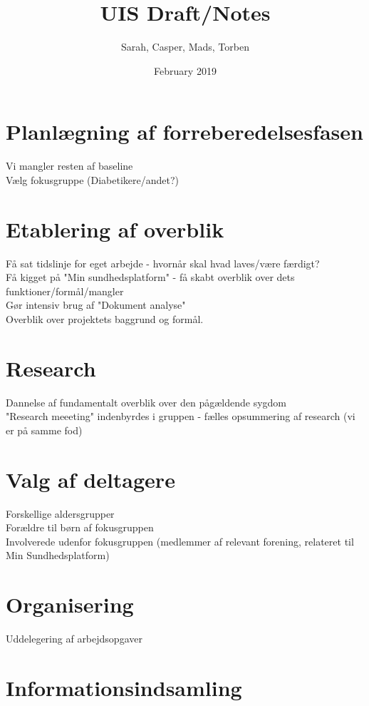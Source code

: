 \documentclass{article}
\title{UIS Draft/Notes}
\author{Sarah, Casper, Mads, Torben}
\date{February 2019}
\begin{document}
\maketitle

\section{Planlægning af forreberedelsesfasen}

Vi mangler resten af baseline 
\\
Vælg fokusgruppe (Diabetikere/andet?)

\section{Etablering af overblik}

Få sat tidslinje for eget arbejde - hvornår skal hvad laves/være færdigt?
\\
Få kigget på "Min sundhedsplatform" - få skabt overblik over dets funktioner/formål/mangler
\\
Gør intensiv brug af "Dokument analyse"
\\
Overblik over projektets baggrund og formål. 

\section{Research}

Dannelse af fundamentalt overblik over den pågældende sygdom
\\
"Research meeeting" indenbyrdes i gruppen - fælles opsummering af research (vi er på samme fod)

\section{Valg af deltagere}

Forskellige aldersgrupper
\\
Forældre til børn af fokusgruppen
\\
Involverede udenfor fokusgruppen (medlemmer af relevant forening, relateret til Min Sundhedsplatform)
\\

\section{Organisering}

Uddelegering af arbejdsopgaver

\section{Informationsindsamling}
\end{document}

